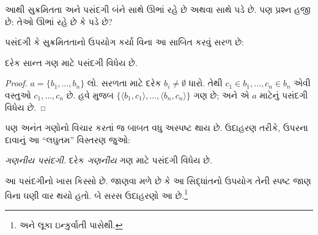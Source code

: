 આથી સુક્રમિતતા અને પસંદગી બંને સાથે
ઊભાં રહે છે અથવા સાથે પડે છે. પણ પ્રશ્ન
હજી છે: તેઓ ઊભાં રહે છે કે પડે છે?
\endgroup

\begingroup
\makeatletter{}\makeatother

\label{guunit:OLP-0597}


પસંદગી કે સુક્રમિતતાનો ઉપયોગ કર્યા વિના
આ સાબિત કરવું સરળ છે:

\begin{lem}[$\Zminus$માં]
દરેક સાન્ત ગણ માટે પસંદગી વિધેય છે.
\end{lem}

\begin{proof}
$a = \{b_1, \ldots, b_n\}$ લો. સરળતા માટે
દરેક $b_i \neq \emptyset$ ધારો. તેથી
$c_1 \in b_1, \ldots, c_n \in b_n$
એવી વસ્તુઓ $c_1, \ldots, c_n$ છે.
હવે 
મુજબ $\{\langle b_1,
c_1\rangle , \ldots, \langle b_n, c_n\rangle\}$
ગણ છે; અને એ $a$ માટેનું પસંદગી વિધેય છે.
\end{proof}

પણ અનંત ગણોનો વિચાર કરતાં જ બાબત
વધુ અસ્પષ્ટ થાય છે. ઉદાહરણ તરીકે,
ઉપરના દાવાનું આ ``લઘુતમ'' વિસ્તરણ જુઓ:

\begin{defish}
\emph{ગણનીય પસંદગી.} દરેક \emph{ગણનીય}
ગણ માટે પસંદગી વિધેય છે.
\end{defish}

આ પસંદગીનો ખાસ કિસ્સો છે. જાણવા મળે છે
કે આ સિદ્ધાંતનો ઉપયોગ તેની સ્પષ્ટ જાણ
વિના ઘણી વાર થયો હતો. બે સરસ ઉદાહરણો
આ છે.\footnote{\citet[\S9.4]{Potter2004}
અને લૂકા ઇન્કુર્વાતી પાસેથી.}

